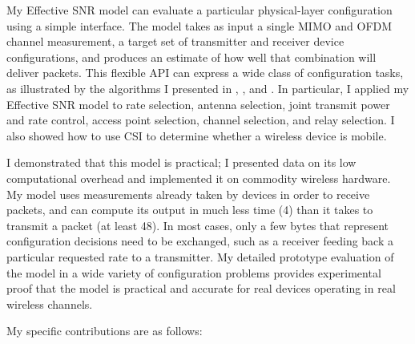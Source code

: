 My Effective SNR model can evaluate a particular physical-layer configuration using a simple interface. The model takes as input a single MIMO and OFDM channel measurement, a target set of transmitter and receiver device configurations, and produces an estimate of how well that combination will deliver packets. This flexible API can express a wide class of configuration tasks, as illustrated by the algorithms I presented in , , and . In particular, I applied my Effective SNR model to rate selection, antenna selection, joint transmit power and rate control, access point selection, channel selection, and relay selection. I also showed how to use CSI to determine whether a wireless device is mobile.

I demonstrated that this model is practical; I presented data on its low computational overhead and implemented it on commodity wireless hardware. My model uses measurements already taken by devices in order to receive packets, and can compute its output in much less time (4\us) than it takes to transmit a packet (at least 48\us). In most cases, only a few bytes that represent configuration decisions need to be exchanged, such as a receiver feeding back a particular requested rate to a transmitter. My detailed prototype evaluation of the model in a wide variety of configuration problems provides experimental proof that the model is practical and accurate for real devices operating in real wireless channels.%

\noheading My specific contributions are as follows:

